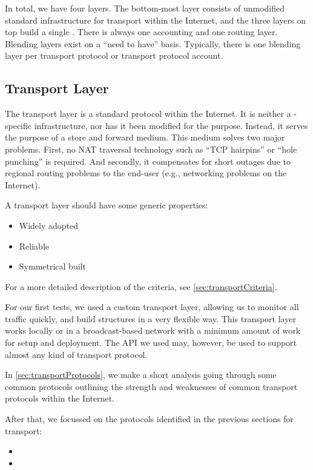 In total, we have four layers. The bottom-most layer consists of unmodified standard infrastructure for transport within the Internet, and the three layers on top build a single \VortexNode. There is always one accounting and one routing layer. Blending layers exist on a ``need to have'' basis. Typically, there is one blending layer per transport protocol or transport protocol account.

\subsection{Transport Layer}
The transport layer is a standard protocol within the Internet. It is neither a \MessageVortex{}-specific infrastructure, nor has it been modified for the purpose. Instead, it serves the purpose of a store and forward medium. This medium solves two major problems. First, no NAT traversal technology such as ``TCP hairpins'' or ``hole punching'' is required. And secondly, it compensates for short outages due to regional routing problems to the end-user (e.g., networking problems on the Internet).

A transport layer should have some generic properties:
\begin{itemize}
	\item Widely adopted 
	\item Reliable
	\item Symmetrical built 
\end{itemize}

For a more detailed description of the criteria, see \cref{sec:transportCriteria}.

For our first tests, we used a custom transport layer, allowing us to monitor all traffic quickly, and build structures in a very flexible way. This transport layer works locally or in a broadcast-based network with a minimum amount of work for setup and deployment. The API we used may, however, be used to support almost any kind of transport protocol.

In \cref{sec:transportProtocols}, we make a short analysis going through some common protocols outlining the strength and weaknesses of common transport protocols within the Internet.

After that, we focussed on the protocols identified in the previous sections for transport:
\begin{itemize}
	\item {}
	\item {}
\end{itemize}

